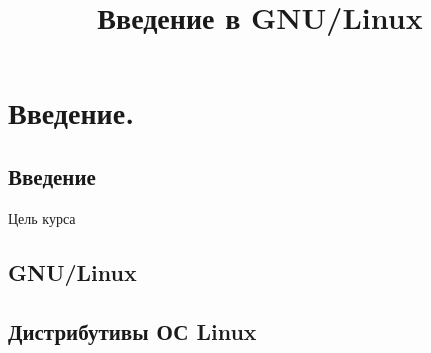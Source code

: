\documentclass[usepdftitle=false,professionalfonts,compress ]{beamer}
\title{Введение в GNU/Linux}
\begin{document}
\frame[plain]{
	\frametitle{}
	\titlepage
	\vspace{-0.5cm}
	\begin{center}
	\end{center}
}
\frame{
	\tableofcontents[hideallsubsections]
}















\section{Введение.}


\subsection{Введение}


\begin{frame}{Цель курса}

\end{frame}



\subsection{GNU/Linux}



\subsection{Дистрибутивы ОС Linux}
\end{document}
